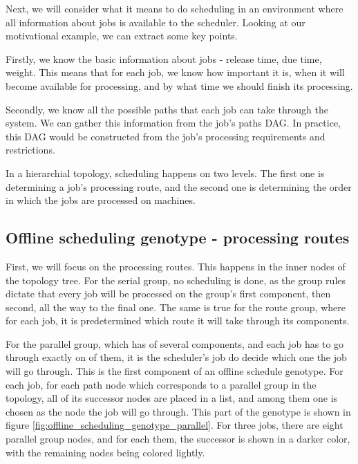 Next, we will consider what it means to do scheduling in an environment where all information about jobs is available to the scheduler. Looking at our motivational example, we can extract some key points.

Firstly, we know the basic information about jobs - release time, due time, weight. This means that for each job, we know how important it is, when it will become available for processing, and by what time we should finish its processing.

Secondly, we know all the possible paths that each job can take through the system. We can gather this information from the job's paths DAG. In practice, this DAG would be constructed from the job's processing requirements and restrictions.

In a hierarchial topology, scheduling happens on two levels. The first one is determining a job's processing route, and the second one is determining the order in which the jobs are processed on machines.

\subsection{Offline scheduling genotype - processing routes}

First, we will focus on the processing routes. This happens in the inner nodes of the topology tree. For the serial group, no scheduling is done, as the group rules dictate that every job will be processed on the group's first component, then second, all the way to the final one. The same is true for the route group, where for each job, it is predetermined which route it will take through its components.

For the parallel group, which has of several components, and each job has to go through exactly on of them, it is the scheduler's job do decide which one the job will go through. This is the first component of an offline schedule genotype. For each job, for each path node which corresponds to a parallel group in the topology, all of its successor nodes are placed in a list, and among them one is chosen as the node the job will go through. This part of the genotype is shown in figure \ref{fig:offline_scheduling_genotype_parallel}. For three jobs, there are eight parallel group nodes, and for each them, the successor is shown in a darker color, with the remaining nodes being colored lightly.

